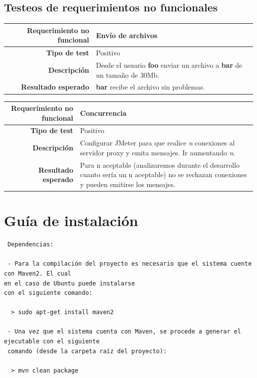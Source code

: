 \documentclass[a4paper,10pt]{article}
\begin{document}
\subsection{Testeos de requerimientos no funcionales}

\begin{center}
  \begin{tabular}{|r|p{12.5cm}|}
    \hline
    \textbf{Requerimiento no funcional}	& Envío de archivos\\
    \hline
    \textbf{Tipo de test}	&	Positivo\\
    \hline
    \textbf{Descripción}	&	Desde el usuario \textbf{foo} enviar un archivo a \textbf{bar} de un tamaño de 30Mb.\\
    \hline
    \textbf{Resultado esperado}	&	\textbf{bar} recibe el archivo sin problemas.\\
    \hline   
  \end{tabular}
\end{center}

\begin{center}
  \begin{tabular}{|r|p{12.5cm}|}
    \hline
    \textbf{Requerimiento no funcional}	& Concurrencia\\
    \hline
    \textbf{Tipo de test}	&	Positivo\\
    \hline
    \textbf{Descripción}	&	Configurar JMeter para que realice \textit{n} conexiones al servidor proxy y emita mensajes.
					Ir aumentando \textit{n}.\\
    \hline
    \textbf{Resultado esperado}	&	Para n aceptable (analizaremos durante el desarrollo cuanto sería un n aceptable) no se rechazan conexiones y pueden emitirse los mensajes.\\
    \hline   
  \end{tabular}
\end{center}

\section{Guía de instalación}

\begin{verbatim}
 Dependencias:

 - Para la compilación del proyecto es necesario que el sistema cuente con Maven2. El cual 
en el caso de Ubuntu puede instalarse
con el siguiente comando:

  > sudo apt-get install maven2

 - Una vez que el sistema cuenta con Maven, se procede a generar el ejecutable con el siguiente
 comando (desde la carpeta raíz del proyecto):

  > mvn clean package
\end{verbatim}
\end{document}
